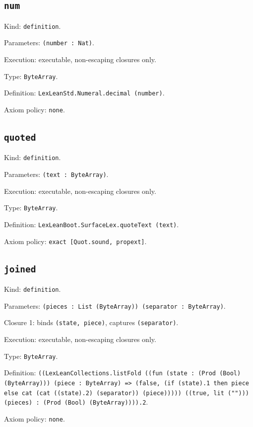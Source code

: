 \documentclass[11pt]{article}
\begin{document}
\subsection*{\texttt{num}}
\noindent Kind: \texttt{definition}.\par
\noindent Parameters: \texttt{(number : Nat)}.\par
\noindent Execution: executable, non-escaping closures only.\par
\noindent Type: \texttt{ByteArray}.\par
\noindent Definition: \texttt{LexLeanStd.Numeral.decimal (number)}.\par
\noindent Axiom policy: \texttt{none}.\par
\subsection*{\texttt{quoted}}
\noindent Kind: \texttt{definition}.\par
\noindent Parameters: \texttt{(text : ByteArray)}.\par
\noindent Execution: executable, non-escaping closures only.\par
\noindent Type: \texttt{ByteArray}.\par
\noindent Definition: \texttt{LexLeanBoot.SurfaceLex.quoteText (text)}.\par
\noindent Axiom policy: \texttt{exact [Quot.sound, propext]}.\par
\subsection*{\texttt{joined}}
\noindent Kind: \texttt{definition}.\par
\noindent Parameters: \texttt{(pieces : List (ByteArray)) (separator : ByteArray)}.\par
\noindent Closure 1: binds \texttt{(state, piece)}, captures \texttt{(separator)}.\par
\noindent Execution: executable, non-escaping closures only.\par
\noindent Type: \texttt{ByteArray}.\par
\noindent Definition: \texttt{((LexLeanCollections.listFold ((fun (state : (Prod (Bool) (ByteArray))) (piece : ByteArray) => (false, (if (state).1 then piece else cat (cat ((state).2) (separator)) (piece))))) ((true, lit (""))) (pieces) : (Prod (Bool) (ByteArray)))).2}.\par
\noindent Axiom policy: \texttt{none}.\par
\end{document}
